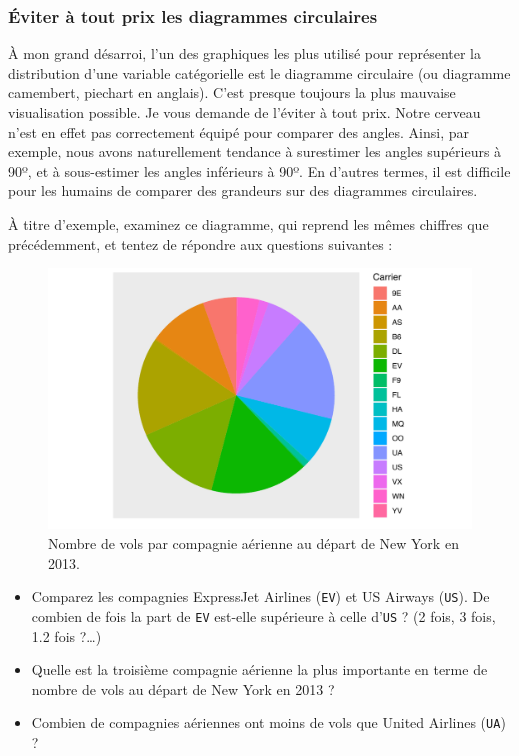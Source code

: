 \documentclass[
  a4paper,
]{article}
\providecommand{\tightlist}{%
  \setlength{\itemsep}{0pt}\setlength{\parskip}{0pt}}
\begin{document}
\hypertarget{uxe9viter-uxe0-tout-prix-les-diagrammes-circulaires}{%
\subsubsection{Éviter à tout prix les diagrammes circulaires}\label{uxe9viter-uxe0-tout-prix-les-diagrammes-circulaires}}

À mon grand désarroi, l'un des graphiques les plus utilisé pour représenter la distribution d'une variable catégorielle est le diagramme circulaire (ou diagramme camembert, piechart en anglais). C'est presque toujours la plus mauvaise visualisation possible. Je vous demande de l'éviter à tout prix. Notre cerveau n'est en effet pas correctement équipé pour comparer des angles. Ainsi, par exemple, nous avons naturellement tendance à surestimer les angles supérieurs à 90º, et à sous-estimer les angles inférieurs à 90º. En d'autres termes, il est difficile pour les humains de comparer des grandeurs sur des diagrammes circulaires.

À titre d'exemple, examinez ce diagramme, qui reprend les mêmes chiffres que précédemment, et tentez de répondre aux questions suivantes :

\begin{figure}[htpb]

{\centering \includegraphics[width=0.9\linewidth]{figure/piechart-1} 

}

\caption{Nombre de vols par compagnie aérienne au départ de New York en 2013.}\label{fig:piechart}
\end{figure}

\begin{itemize}
\tightlist
\item
  Comparez les compagnies ExpressJet Airlines (\texttt{EV}) et US Airways (\texttt{US}). De combien de fois la part de \texttt{EV} est-elle supérieure à celle d'\texttt{US} ? (2 fois, 3 fois, 1.2 fois ?\ldots)
\item
  Quelle est la troisième compagnie aérienne la plus importante en terme de nombre de vols au départ de New York en 2013 ?
\item
  Combien de compagnies aériennes ont moins de vols que United Airlines (\texttt{UA}) ?
\end{itemize}
\end{document}
